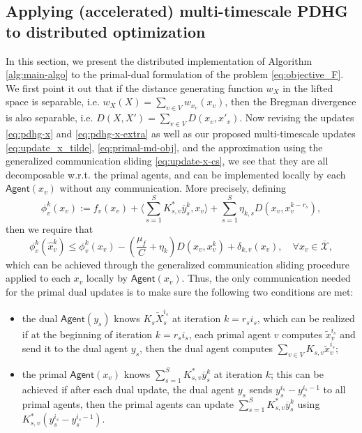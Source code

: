 \documentclass[10pt]{article}
\newcommand{\mc}{\mathcal}
\newcommand{\agent}{\mathsf{Agent}}
\begin{document}
\subsection{Applying (accelerated) multi-timescale PDHG to distributed optimization}\label{sec:do-pdhg}
In this section, we present the distributed implementation of Algorithm \ref{alg:main-algo} to the primal-dual formulation of the problem \eqref{eq:objective_F}. We first point it out that if the distance generating function $w_X$ in the lifted space is separable, i.e. $w_X(X) = \sum_{v\in V}w_{x_v}(x_v)$, then the Bregman divergence is also separable, i.e. $D(X,X') = \sum_{v\in V} D(x_v,x'_v)$. Now revising the updates \eqref{eq:pdhg-x} and \eqref{eq:pdhg-x-extra} as well as our proposed multi-timescale updates \eqref{eq:update_x_tilde}, \eqref{eq:primal-md-obj}, and the approximation using the generalized communication sliding \eqref{eq:update-x-cs}, we see that they are all decomposable w.r.t. the primal agents, and can be implemented locally by each $\agent(x_v)$ without any communication. More precisely, defining 
\begin{equation}\label{eq:primal-md-obj-decompose}
    \phi_v^k(x_v):=f_v(x_v) + \langle \sum_{s=1}^SK_{s,v}^* \overline{y}_s^k,x_v\rangle + \sum_{s=1}^S \eta_{k,s}D(x_v,x_v^{k-r_s}), 
\end{equation}
then we require that 
\begin{equation}\label{eq:primal-approx-prop-decompose}
    \phi_v^k(\widehat{x}_v^k) \leq \phi_v^k(x_v) -(\frac{\mu_f}{C} +\eta_k)D(x_v,x_v^k)+ \delta_{k,v}(x_v),\quad \forall x_v\in \overline{\mc X},
\end{equation}
which can be achieved through the generalized communication sliding procedure applied to each $x_v$ locally by $\agent(x_v)$. Thus, the only communication needed for the primal dual updates is to make sure the following two conditions are met: 
\begin{itemize}
    \item the dual $\agent(y_s)$ knows $K_s\widetilde{X}_s^{i_s}$ at iteration $k=r_si_s$, which can be realized if at the beginning of iteration $k=r_si_s$, each primal agent $v$ computes $\widetilde{x}_{v}^{i_s}$ and send it to the dual agent $y_s$, then the dual agent computes $\sum_{v\in V} K_{s,v}\widetilde{x}_{v}^{i_s}$;
    \item the primal $\agent(x_v)$ knows $\sum_{s=1}^S K^*_{s,v} \overline{y}_s^k$ at iteration $k$; this can be achieved if after each dual update, the dual agent $y_s$ sends $y_{s}^{i_s} - y_s^{i_s-1}$ to all primal agents, then the primal agents can update $\sum_{s=1}^S K^*_{s,v} \overline{y}_s^k$ using $K^*_{s,v}(y_{s}^{i_s} - y_s^{i_s-1})
    $.
\end{itemize}
\end{document}
